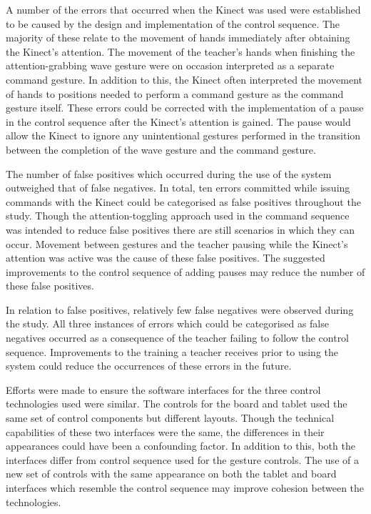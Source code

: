 \documentclass[manuscript, review, screen]{acmart}
\begin{document}
A number of the errors that occurred when the Kinect was used were established to be caused by the design and implementation of the control sequence.
The majority of these relate to the movement of hands immediately after obtaining the Kinect's attention.
The movement of the teacher's hands when finishing the attention-grabbing wave gesture were on occasion interpreted as a separate command gesture.
In addition to this, the Kinect often interpreted the movement of hands to positions needed to perform a command gesture as the command gesture itself.
These errors could be corrected with the implementation of a pause in the control sequence after the Kinect's attention is gained.
The pause would allow the Kinect to ignore any unintentional gestures performed in the transition between the completion of the wave gesture and the command gesture.

The number of false positives which occurred during the use of the system outweighed that of false negatives.
In total, ten errors committed while issuing commands with the Kinect could be categorised as false positives throughout the study.
Though the attention-toggling approach used in the command sequence was intended to reduce false positives there are still scenarios in which they can occur.
Movement between gestures and the teacher pausing while the Kinect's attention was active was the cause of these false positives.
The suggested improvements to the control sequence of adding pauses may reduce the number of these false positives.

In relation to false positives, relatively few false negatives were observed during the study.
All three instances of errors which could be categorised as false negatives occurred as a consequence of the teacher failing to follow the control sequence.
Improvements to the training a teacher receives prior to using the system could reduce the occurrences of these errors in the future.

Efforts were made to ensure the software interfaces for the three control technologies used were similar.
The controls for the board and tablet used the same set of control components but different layouts.
Though the technical capabilities of these two interfaces were the same, the differences in their appearances could have been a confounding factor.
In addition to this, both the interfaces differ from control sequence used for the gesture controls.
The use of a new set of controls with the same appearance on both the tablet and board interfaces which resemble the control sequence may improve cohesion between the technologies.
\end{document}
